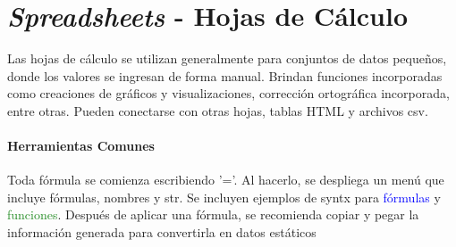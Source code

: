 
\section{\textit{Spreadsheets} - Hojas de Cálculo}
Las hojas de cálculo se utilizan generalmente para conjuntos de datos pequeños, donde los valores se ingresan de forma manual. Brindan funciones incorporadas como creaciones de gráficos y visualizaciones, corrección ortográfica incorporada, entre otras. Pueden conectarse con otras hojas, tablas HTML y archivos \gls{csv}.

\paragraph{Herramientas Comunes}
Toda fórmula se comienza escribiendo '='. Al hacerlo, se despliega un menú que incluye fórmulas, nombres y \gls{str}. Se incluyen ejemplos de \gls{syntx} para \textcolor{blue}{fórmulas} y \textcolor{ForestGreen}{funciones}. Después de aplicar una fórmula, se recomienda copiar y pegar la información generada para convertirla en datos estáticos
